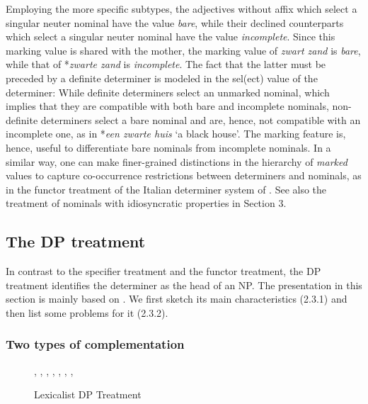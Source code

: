 \documentclass[output=paper]{langsci/langscibook}
\begin{document}
Employing the more specific subtypes, the adjectives without affix which select a singular 
neuter nominal have the value {\it bare}, while their declined counterparts which select 
a singular neuter nominal have the value {\it incomplete}. 
Since this {\sc marking} value is shared with the mother, the {\sc marking} value 
of {\it zwart zand\/} is {\it bare\/}, while that of *{\it zwarte zand\/} is {\it incomplete}. 
The fact that the latter must be preceded by a definite determiner
is modeled in the {\sc sel(ect)} value of the determiner: 
While definite determiners select an unmarked nominal, which implies that 
they are compatible with both bare and incomplete nominals,
non-definite determiners select a bare nominal and are, hence, not compatible 
with an incomplete one, as in *{\it een zwarte huis\/} `a black house'. 
The {\sc marking} feature is, hence, useful to differentiate bare 
nominals from incomplete nominals.  
In a similar way, one can make finer-grained distinctions in the hierarchy of  
{\it marked} values to capture co-occurrence restrictions between determiners and 
nominals, as in the functor treatment of the Italian determiner system of 
\citet{Allegranza06}. See also the treatment of nominals with idiosyncratic properties 
in Section 3. 


\subsection{The DP treatment} 


In contrast to the specifier treatment and the functor treatment, the DP 
treatment identifies the determiner as the head of an NP. The presentation in this section   
is mainly based on \citet{Netter94}. We first sketch its main characteristics (2.3.1)
and then list some problems for it (2.3.2). 


\subsubsection{Two types of complementation} 


\begin{figure}
\begin{center}
\footnotesize
\tree
{,
  {,
    {}},
  {,
    {,
      {}},
    {, 
      {}}}}
\caption{\label{net} Lexicalist DP Treatment }
\normalsize
\end{center}
\end{figure} 
\end{document}
